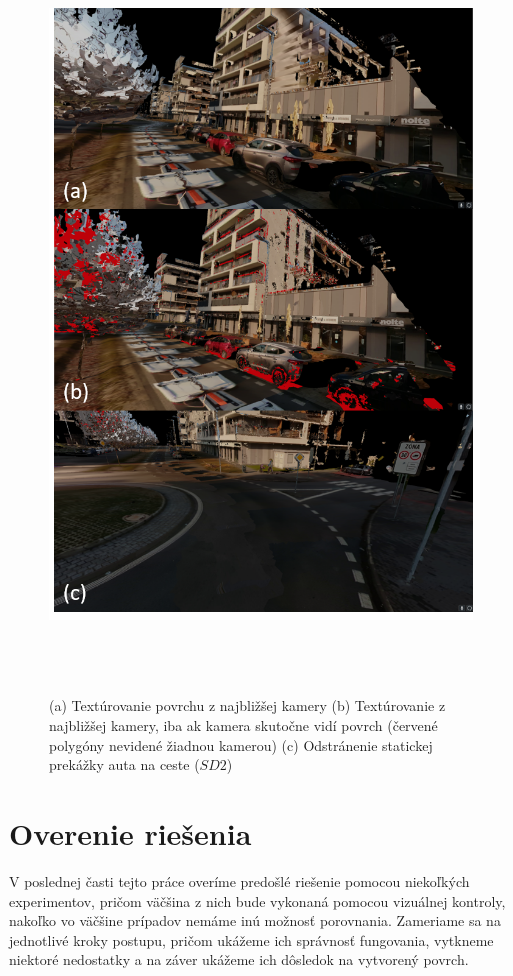 \begin{figure}[!htbp]
  \centering
  \includegraphics[width=16cm, height=20cm]{img/texturing_process.png}
  \caption{(a) Textúrovanie povrchu z najbližšej kamery (b) Textúrovanie z najbližšej kamery, iba ak kamera skutočne vidí povrch (červené polygóny nevidené žiadnou kamerou) (c) Odstránenie statickej prekážky auta na ceste ($SD2$)} 
  \label{fig:texture_process}
\end{figure} 

\section{Overenie riešenia}
\noindent V poslednej časti tejto práce overíme predošlé riešenie pomocou niekoľkých experimentov, pričom väčšina z nich bude vykonaná pomocou vizuálnej kontroly, nakoľko vo väčšine prípadov nemáme inú možnosť porovnania. Zameriame sa na jednotlivé kroky postupu, pričom ukážeme ich správnosť fungovania, vytkneme niektoré nedostatky a na záver ukážeme ich dôsledok na vytvorený povrch.

